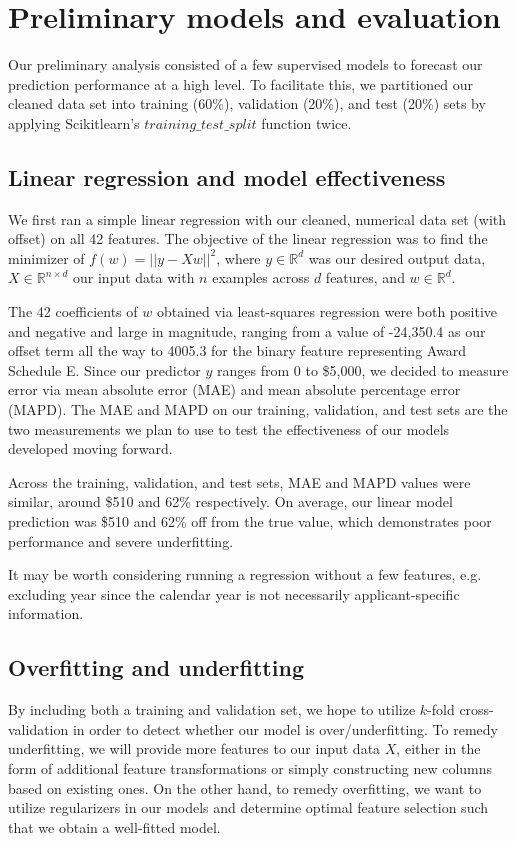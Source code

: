 \documentclass[11pt, fleqn]{article}
\begin{document}
\section{Preliminary models and evaluation}
Our preliminary analysis consisted of a few supervised models to forecast our prediction performance at a high level. To facilitate this, we partitioned our cleaned data set into training (60\%), validation (20\%), and test (20\%) sets by applying Scikitlearn's $training\_test\_split$ function twice.


\subsection{Linear regression and model effectiveness}
We first ran a simple linear regression with our cleaned, numerical data set (with offset) on all 42 features. The objective of the linear regression was to find the minimizer of $f(w) = ||y - Xw||^2$, where $y \in \mathbb{R}^{d}$ was our desired output data, $X \in \mathbb{R}^{n \times d}$ our input data with $n$ examples across $d$ features, and $w \in \mathbb{R}^{d}$.

The 42 coefficients of $w$ obtained via least-squares regression were both positive and negative and large in magnitude, ranging from a value of -24,350.4 as our offset term all the way to 4005.3 for the binary feature representing Award Schedule E. Since our predictor $y$ ranges from 0 to \$5,000, we decided to measure error via mean absolute error (MAE) and mean absolute percentage error (MAPD). The MAE and MAPD on our training, validation, and test sets are the two measurements we plan to use to test the effectiveness of our models developed moving forward.

Across the training, validation, and test sets, MAE and MAPD values were similar, around \$510 and 62\% respectively. On average, our linear model prediction was \$510 and 62\% off from the true value, which demonstrates poor performance and severe underfitting.

It may be worth considering running a regression without a few features, e.g. excluding year since the calendar year is not necessarily applicant-specific information.

\subsection{Overfitting and underfitting}
By including both a training and validation set, we hope to utilize $k$-fold cross-validation in order to detect whether our model is over/underfitting. To remedy underfitting, we will provide more features to our input data $X$, either in the form of additional feature transformations or simply constructing new columns based on existing ones. On the other hand, to remedy overfitting, we want to utilize regularizers in our models and determine optimal feature selection such that we obtain a well-fitted model.
\end{document}
